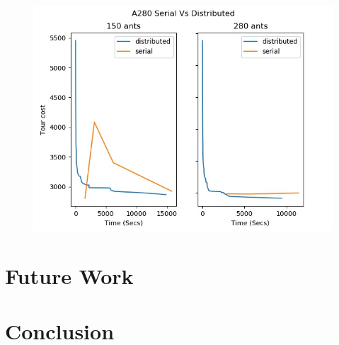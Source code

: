 \documentclass[12pt]{article}
\begin{document}
\begin{figure}
    \includegraphics[scale=0.5]{a280_serial_vs_dist.jpg}
\end{figure}

\section{Future Work}
\section{Conclusion}




\end{document}
